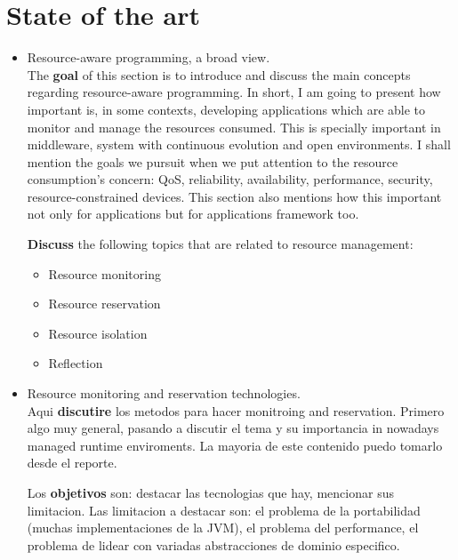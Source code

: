 
\chapter{State of the art}
\label{chap:indus_contexte}


\begin{itemize}
\item Resource-aware programming, a broad view. \\
The \textbf{goal} of this section is to introduce and discuss the main concepts regarding resource-aware programming.
In short, I am going to present how important is, in some contexts, developing applications which are able to monitor and manage the resources consumed.
This is specially important in middleware, system with continuous evolution and open environments.
I shall mention the goals we pursuit when we put attention to the resource consumption's concern: QoS, reliability, availability, performance, security, resource-constrained devices.
This section also mentions how this important not only for applications but for applications framework too.

\textbf{Discuss} the following topics that are related to resource management:
\begin{itemize}
\item Resource monitoring
\item Resource reservation
\item Resource isolation
\item Reflection
\end{itemize}

\item Resource monitoring and reservation technologies.\\
Aqui \textbf{discutire} los metodos para hacer monitroing and reservation. Primero algo muy general, pasando a discutir el tema y su importancia in nowadays managed runtime enviroments. La mayoria de este contenido puedo tomarlo desde el reporte.

Los \textbf{objetivos} son: destacar las tecnologias que hay, mencionar sus limitacion. Las limitacion a destacar son: el problema de la portabilidad (muchas implementaciones de la JVM), el problema del performance, el problema de lidear con variadas abstracciones de dominio especifico. 


\end{itemize}
